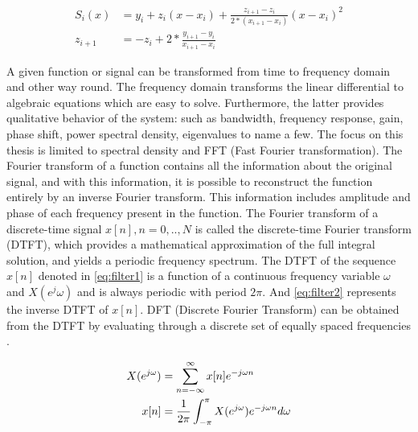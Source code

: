 \begin{subequations} \label{eq:spline}
\begin{align}
S_i (x) & = y_i + z_i (x - x_i) + \frac{z_{i+1} - z_i}{2 * (x_{i+1} - x_i)} (x-x_i)^2  \\
z_{i+1} & = - z_i + 2 * \frac{y_{i+1} - y_i}{x_{i+1} - x_i}
\end{align}
\end{subequations}

%

A given function or signal can be transformed  from time to frequency domain and other way round. The frequency domain transforms the linear differential to algebraic equations which are easy to solve. Furthermore, the latter provides qualitative behavior of the system: such as bandwidth, frequency response, gain, phase shift, power spectral density, eigenvalues to name a few. The focus on this thesis is limited to spectral density and FFT (Fast Fourier transformation). The Fourier transform of a function contains all the information about the original signal, and with this information, it is possible to reconstruct the function entirely by an inverse Fourier transform. This information includes amplitude and phase of each frequency present in the function. 
The Fourier transform of a discrete-time signal $x[n], n=0,..,N$ is called the discrete-time Fourier transform (DTFT), which provides a mathematical approximation of the full integral solution, and yields a periodic frequency spectrum. The DTFT of the sequence $x[n]$ denoted in  \eqref{eq:filter1} is a function of a continuous frequency variable $\omega$ and $X(e^j\omega )$ and is always periodic with period $2 \pi$. And \eqref{eq:filter2} represents the inverse DTFT of $x[n]$. DFT (Discrete Fourier Transform) can be obtained from the DTFT by evaluating through a discrete set of equally spaced frequencies \cite{mcclellan2003signal}. 

\begin{subequations}
\begin{align} 
\centering
X( e^{j\omega} ) & = \sum_{n=- \infty}^{\infty} x[n] e^{-j \omega n} \label{eq:filter1}\\
x[n]  & = \frac{1}{2 \pi} \int_{- \pi}^{\pi} X( e^{j\omega} ) e^{-j \omega n} d \omega \label{eq:filter2}
\end{align}
\end{subequations}

